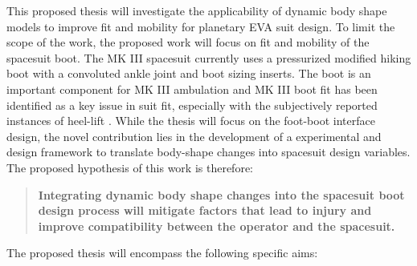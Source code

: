 \documentclass[defaultstyle,11pt]{thesis}
\begin{document}
This proposed thesis will investigate the applicability of dynamic body shape models to improve fit and mobility for planetary EVA suit design.
To limit the scope of the work, the proposed work will focus on fit and mobility of the spacesuit boot.
The MK III spacesuit currently uses a pressurized modified hiking boot with a convoluted ankle joint and boot sizing inserts.
The boot is an important component for MK III ambulation and MK III boot fit has been identified as a key issue in suit fit, especially with the subjectively reported instances of heel-lift \citep{Fineman2018}.
While the thesis will focus on the foot-boot interface design, the novel contribution lies in the development of a experimental and design framework to translate body-shape changes into spacesuit design variables.
The proposed hypothesis of this work is therefore:

\begin{quote}
\textbf{Integrating dynamic body shape changes into the spacesuit boot design process will mitigate factors that lead to injury and improve compatibility between the operator and the spacesuit.}
\end{quote}

The proposed thesis will encompass the following specific aims:
\end{document}
